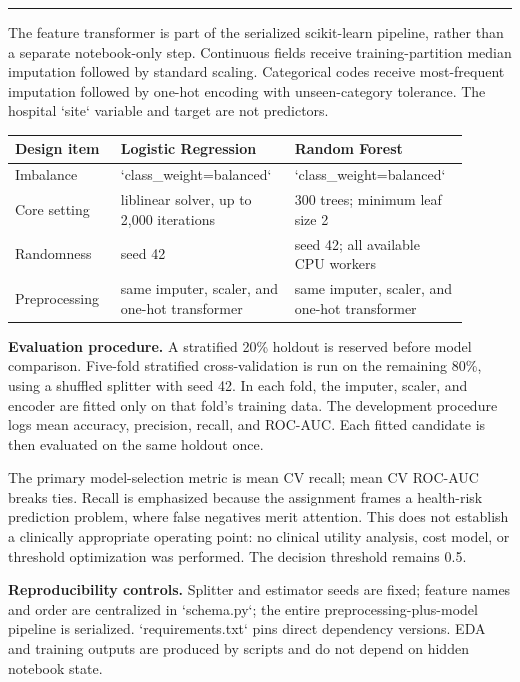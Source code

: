 \documentclass[10pt]{article}
\newcommand{\sectiontitle}[1]{\vspace*{0.15in}{\Large\bfseries\color{navy}#1}\par\vspace{0.08in}\hrule\vspace{0.16in}}
\begin{document}
\newpage
\sectiontitle{3. Feature engineering and model design}
The feature transformer is part of the serialized scikit-learn pipeline, rather than a separate notebook-only step. Continuous fields receive training-partition median imputation followed by standard scaling. Categorical codes receive most-frequent imputation followed by one-hot encoding with unseen-category tolerance. The hospital `site` variable and target are not predictors.

\begin{center}
\begin{tabular}{p{0.22\linewidth}p{0.34\linewidth}p{0.34\linewidth}}
\toprule
Design item & Logistic Regression & Random Forest \\
\midrule
Imbalance & `class\_weight=balanced` & `class\_weight=balanced` \\
Core setting & liblinear solver, up to 2,000 iterations & 300 trees; minimum leaf size 2 \\
Randomness & seed 42 & seed 42; all available CPU workers \\
Preprocessing & same imputer, scaler, and one-hot transformer & same imputer, scaler, and one-hot transformer \\
\bottomrule
\end{tabular}
\end{center}

\textbf{Evaluation procedure.} A stratified 20\% holdout is reserved before model comparison. Five-fold stratified cross-validation is run on the remaining 80\%, using a shuffled splitter with seed 42. In each fold, the imputer, scaler, and encoder are fitted only on that fold's training data. The development procedure logs mean accuracy, precision, recall, and ROC-AUC. Each fitted candidate is then evaluated on the same holdout once.

The primary model-selection metric is mean CV recall; mean CV ROC-AUC breaks ties. Recall is emphasized because the assignment frames a health-risk prediction problem, where false negatives merit attention. This does not establish a clinically appropriate operating point: no clinical utility analysis, cost model, or threshold optimization was performed. The decision threshold remains 0.5.

\textbf{Reproducibility controls.} Splitter and estimator seeds are fixed; feature names and order are centralized in `schema.py`; the entire preprocessing-plus-model pipeline is serialized. `requirements.txt` pins direct dependency versions. EDA and training outputs are produced by scripts and do not depend on hidden notebook state.
\end{document}
